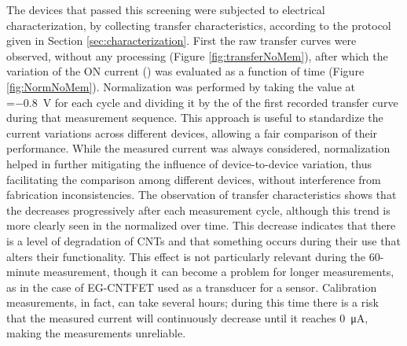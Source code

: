 The devices that passed this screening were subjected to electrical characterization, by collecting transfer characteristics, according to the protocol given in Section \ref{sec:characterization}. First the raw transfer curves were observed, without any processing (Figure \ref{fig:transferNoMem}), after which the variation of the ON current (\ion{}) was evaluated as a function of time (Figure \ref{fig:NormNoMem}). Normalization was performed by taking the \ion{} value at \vgs{}=\SI{-0.8}{\V} for each cycle and dividing it by the \ion{} of the first recorded transfer curve during that measurement sequence. This approach is useful to standardize the current variations across different devices, allowing a fair comparison of their performance. While the measured current was always considered, normalization helped in further mitigating the influence of device-to-device variation, thus facilitating the comparison among different devices, without interference from fabrication inconsistencies.
The observation of transfer characteristics shows that the \ids{} decreases progressively after each measurement cycle, although this trend is more clearly seen in the normalized \ion{} over time. This decrease indicates that there is a level of degradation of CNTs and that something occurs during their use that alters their functionality. This effect is not particularly relevant during the 60-minute measurement, though it can become a problem for longer measurements, as in the case of EG-CNTFET used as a transducer for a sensor. Calibration measurements, in fact, can take several hours; during this time there is a risk that the measured current will continuously decrease until it reaches \SI{0}{\uA}, making the measurements unreliable.

